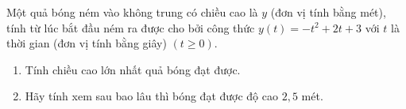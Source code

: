 \begin{bt}%
 Một quả bóng ném vào không trung có chiều cao là $y$ (đơn vị tính bằng mét), tính từ lúc bắt đầu ném ra được cho bởi công thức $y(t)=-t^2+2t+3$ với 
 $t$ là thời gian (đơn vị tính bằng giây) $(t \ge 0)$.
 \begin{enumerate}
 	\item Tính chiều cao lớn nhất quả bóng đạt được.
 	\item Hãy tính xem sau bao lâu thì bóng đạt được độ cao $2{,}5$ mét.
 \end{enumerate}
\end{bt}


